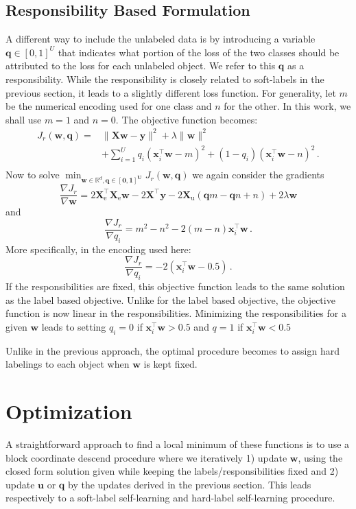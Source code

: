 \documentclass[conference,a4paper,10pt]{IEEEtran}\usepackage[]{graphicx}\usepackage[]{color}
\begin{document}
\subsection{Responsibility Based Formulation}
A different way to include the unlabeled data is by introducing a variable $\mathbf{q} \in [0,1]^U$ that indicates what portion of the loss of the two classes should be attributed to the loss for each unlabeled object. We refer to this $\mathbf{q}$ as a responsibility. While the responsibility is closely related to soft-labels in the previous section, it leads to a slightly different loss function. For generality, let $m$ be the numerical encoding used for one class and $n$ for the other. In this work, we shall use $m=1$ and $n=0$. The objective function becomes:
\begin{align}
J_r(\mathbf{w},\mathbf{q}) = & \| \mathbf{X} \mathbf{w}-\mathbf{y} \|^2 + \lambda \|\mathbf{w} \|^2 \nonumber \\
& + \sum_{i=1}^{U}  q_i (\mathbf{x}_i^\top \mathbf{w} - m)^2  + (1-q_i) (\mathbf{x}_i^\top \mathbf{w} - n)^2 \,. \nonumber \\ \nonumber
\end{align}
Now to solve $\min_{\mathbf{w} \in \mathbb{R}^d, \mathbf{\mathbf{q} \in [0,1]^U}} J_r(\mathbf{w},\mathbf{q})$ we again consider the gradients
$$
\frac{\nabla J_r}{\nabla \mathbf{w}} = 2 \mathbf{X}^\top_\text{e} \mathbf{X}_\text{e} \mathbf{w} - 2 \mathbf{X}^\top \mathbf{y}  - 2 \mathbf{X}_\text{u} (\mathbf{q} m - \mathbf{q} n + n ) + 2 \lambda \mathbf{w}
$$
and
$$
\frac{\nabla J_r}{\nabla q_i} = m^2 - n^2 - 2 (m-n) \mathbf{x}_i^\top \mathbf{w} \,.
$$
More specifically, in the encoding used here:
$$
\frac{\nabla J_r}{\nabla q_i} = - 2 (\mathbf{x}_i^\top \mathbf{w}-0.5) \,.
$$
If the responsibilities are fixed, this objective function leads to the same solution as the label based objective. Unlike for the label based objective, the objective function is now linear in the responsibilities. Minimizing the responsibilities for a given $\mathbf{w}$ leads to setting $q_i=0$ if  $\mathbf{x}_i^\top \mathbf{w}>0.5$ and $q=1$ if $\mathbf{x}_i^\top \mathbf{w}<0.5$

Unlike in the previous approach, the optimal procedure becomes to assign hard labelings to each object when $\mathbf{w}$ is kept fixed.

\section{Optimization}
A straightforward approach to find a local minimum of these functions is to use a block coordinate descend procedure where we iteratively 1) update $\mathbf{w}$, using the closed form solution given while keeping the labels/responsibilities fixed and 2) update $\mathbf{u}$ or $\mathbf{q}$ by the updates derived in the previous section. This leads respectively to a soft-label self-learning and hard-label self-learning procedure.
\end{document}
